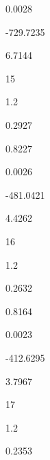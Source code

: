 \documentclass[a4paper,portrait,12pt]{article}
\begin{document}
0.0028





-729.7235





6.7144





15





1.2





0.2927





0.8227





0.0026





-481.0421





4.4262





16





1.2





0.2632





0.8164





0.0023





-412.6295





3.7967





17





1.2





0.2353
\end{document}

